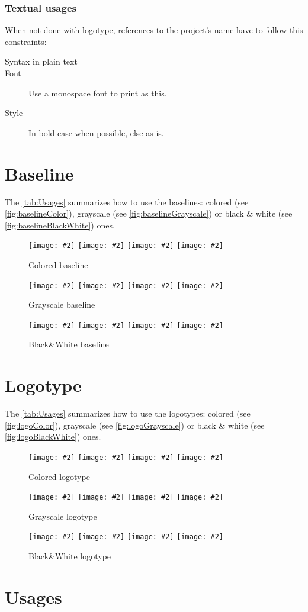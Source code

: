 \documentclass[a4paper,oneside]{article}
\newcommand{\proposition}[4][\textwidth]{%
    \begin{figure}[h]
        \centering
            \begin{minipage}[c]{#1}
                \centering
                \texttt{[image: \#2]}
                \vline{}
                \texttt{[image: \#2]}
                \vline{}
                \texttt{[image: \#2]}
                \vline{}
                \texttt{[image: \#2]}
                \caption{#3}
                \label{#4}
            \end{minipage}
    \end{figure}
}
\begin{document}
\subsubsection{Textual usages}
When not done with logotype, references to the project's name have to follow this constraints:
\begin{description}
    \item[Syntax in plain text] \texttt{\vilain{}}
    \item[Font] Use a monospace font to print \texttt{\vilain{}} as
    this.
    \item[Style] \texttt{\vilain{}} In bold case when possible, else
    as is.
\end{description}

\section{Baseline}
The \tablename{} \vref{tab:Usages} summarizes how to use the
baselines: colored (see \figurename{} \vref{fig:baselineColor}),
grayscale (see \figurename{} \vref{fig:baselineGrayscale}) or black \&
white (see \figurename{} \vref{fig:baselineBlackWhite}) ones.

\proposition{baseline_color_cmyk.pdf}{Colored
  baseline}{fig:baselineColor}
\proposition{baseline_grayscale_cmyk.pdf}{Grayscale
  baseline}{fig:baselineGrayscale}
\proposition{baseline_black-and-white_cmyk.pdf}{Black\&White
  baseline}{fig:baselineBlackWhite}

\cleardoublepage{}
\section{Logotype}
The \tablename{} \vref{tab:Usages} summarizes how to use the
logotypes: colored (see \figurename{} \vref{fig:logoColor}),
grayscale (see \figurename{} \vref{fig:logoGrayscale}) or black \&
white (see \figurename{} \vref{fig:logoBlackWhite}) ones.

\proposition{logo_color_cmyk.pdf}{Colored logotype}{fig:logoColor}
\proposition{logo_grayscale_cmyk.pdf}{Grayscale
  logotype}{fig:logoGrayscale}
\proposition{logo_black-and-white_cmyk.pdf}{Black\&White
  logotype}{fig:logoBlackWhite}

\cleardoublepage{}
\section{Usages}
\end{document}
